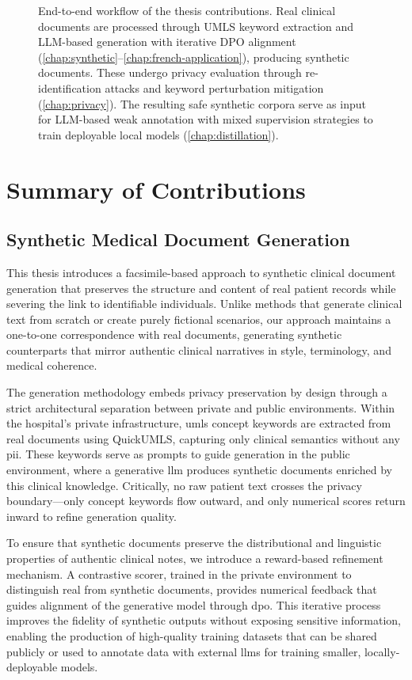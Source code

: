 \begin{figure}[htp!]
{\begin{tikzpicture}
\end{tikzpicture}}%
\caption{End-to-end workflow of the thesis contributions. Real clinical documents are processed through UMLS keyword extraction and LLM-based generation with iterative DPO alignment (\autoref{chap:synthetic}--\autoref{chap:french-application}), producing synthetic documents. These undergo privacy evaluation through re-identification attacks and keyword perturbation mitigation (\autoref{chap:privacy}). The resulting safe synthetic corpora serve as input for LLM-based weak annotation with mixed supervision strategies to train deployable local models (\autoref{chap:distillation}).}
\label{fig:thesis-workflow}
\end{figure}

\section{Summary of Contributions}

\subsection{Synthetic Medical Document Generation}

This thesis introduces a facsimile-based approach to synthetic clinical document generation that preserves the structure and content of real patient records while severing the link to identifiable individuals.
Unlike methods that generate clinical text from scratch or create purely fictional scenarios, our approach maintains a one-to-one correspondence with real documents, generating synthetic counterparts that mirror authentic clinical narratives in style, terminology, and medical coherence.

The generation methodology embeds privacy preservation by design through a strict architectural separation between private and public environments.
Within the hospital's private infrastructure, \gls{umls} concept keywords are extracted from real documents using QuickUMLS, capturing only clinical semantics without any \gls{pii}.
These keywords serve as prompts to guide generation in the public environment, where a generative \gls{llm} produces synthetic documents enriched by this clinical knowledge.
Critically, no raw patient text crosses the privacy boundary—only concept keywords flow outward, and only numerical scores return inward to refine generation quality.

To ensure that synthetic documents preserve the distributional and linguistic properties of authentic clinical notes, we introduce a reward-based refinement mechanism.
A contrastive scorer, trained in the private environment to distinguish real from synthetic documents, provides numerical feedback that guides alignment of the generative model through \gls{dpo}.
This iterative process improves the fidelity of synthetic outputs without exposing sensitive information, enabling the production of high-quality training datasets that can be shared publicly or used to annotate data with external \glspl{llm} for training smaller, locally-deployable models.

